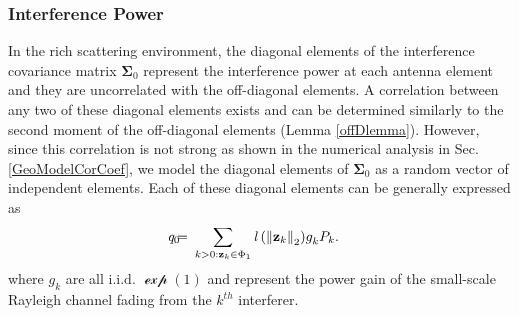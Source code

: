 \documentclass[12pt, draftclsnofoot, onecolumn]{IEEEtran}
\theoremstyle{plain}
\begin{document}
\subsubsection{Interference Power}\label{Diag}
In the rich scattering environment, the diagonal elements  of the interference covariance matrix $\boldsymbol{\Sigma}_{0}$ represent the interference power at each antenna element and they are uncorrelated with the off-diagonal elements. A correlation between any two of these diagonal elements exists and can be determined similarly to the second moment of the off-diagonal elements (Lemma \ref{offDlemma}). However, since this correlation is not strong as shown in the numerical analysis in Sec. \ref{GeoModelCorCoef}, 
we model the diagonal elements of $\boldsymbol{\Sigma}_{0}$ as a random vector of independent elements. Each of these diagonal elements can be generally expressed as
\begin{eqnarray}
\!\!\!\!\!\!\mathit{q}_{0}&\!\!\!=&\!\!\!\sum_{k>0:\bold{z}_k\in \Phi_1} {\mathit{l}\left({\Vert \bold{z}_k \Vert}_2\right)}    {g}_{k}^{} P_{k} .\label{eq25}
\end{eqnarray}
where $ {g}_{k}^{}$ are all $ \text{i.i.d. } \mathcal{\exp} (1) $ and represent the power gain of the small-scale Rayleigh channel fading  from the $k^{th}$ interferer.
\end{document}
